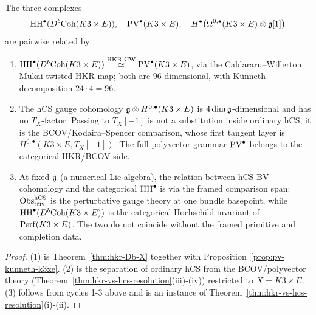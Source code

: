 \begin{theorem}[Triple HKR comparison boundary on $X = K3\times E$]
\label{thm:triple-hkr-K3xE}
The three complexes
\[
 \mathrm{HH}^\bullet(D^b\mathrm{Coh}(K3\times E)),
 \quad
 \mathrm{PV}^\bullet(K3\times E),
 \quad
 H^\bullet\bigl(\Omega^{0,\bullet}(K3\times E)\otimes\mathfrak{g}[1]\bigr)
\]
are pairwise related by:
\begin{enumerate}
\item $\mathrm{HH}^\bullet(D^b\mathrm{Coh}(K3\times E)) \stackrel{\mathrm{HKR},\mathrm{CW}}{\simeq}
 \mathrm{PV}^\bullet(K3\times E)$, via the Caldararu--Willerton Mukai-twisted
 HKR map; both are $96$-dimensional, with K\"unneth decomposition
 $24\cdot 4 = 96$.
\item The hCS gauge cohomology $\mathfrak{g}\otimes H^{0,\bullet}(K3\times E)$
 is $4\dim\mathfrak{g}$-dimensional and has no $T_X$-factor. Passing to
 $T_X[-1]$ is not a substitution inside ordinary hCS; it is the
 BCOV/Kodaira--Spencer comparison, whose first tangent layer is
 $H^{0,\bullet}(K3\times E,T_X[-1])$. The full polyvector grammar
 $\mathrm{PV}^\bullet$ belongs to the categorical HKR/BCOV side.
\item At fixed $\mathfrak{g}$ (a numerical Lie algebra), the relation
 between hCS-BV cohomology and the categorical $\mathrm{HH}^\bullet$ is via
 the framed comparison span: $\mathrm{Obs}^{\mathrm{hCS}}_{\mathrm{triv}}$ is the
 perturbative gauge theory at one bundle basepoint, while
 $\mathrm{HH}^\bullet(D^b\mathrm{Coh}(K3\times E))$ is the categorical Hochschild
 invariant of $\mathrm{Perf}(K3\times E)$. The two do not coincide without
 the framed primitive and completion data.
\end{enumerate}
\end{theorem}

\begin{proof}
(1) is Theorem~\ref{thm:hkr-Db-X} together with
Proposition~\ref{prop:pv-kunneth-k3xe}.
(2) is the separation of ordinary hCS from the BCOV/polyvector theory
(Theorem~\ref{thm:hkr-vs-hcs-resolution}(iii)-(iv)) restricted to
$X = K3\times E$.
(3) follows from cycles 1-3 above and is an instance of
Theorem~\ref{thm:hkr-vs-hcs-resolution}(i)-(ii).
\end{proof}

